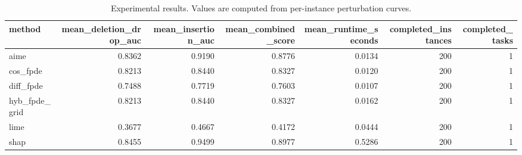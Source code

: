 \begin{table}[t]
\caption{Experimental results. Values are computed from per-instance perturbation curves.}
\label{tab:main_results_computed}
\centering
\begin{tabular}{lrrrrrr}
\toprule
method & mean\_deletion\_drop\_auc & mean\_insertion\_auc & mean\_combined\_score & mean\_runtime\_seconds & completed\_instances & completed\_tasks \\
\midrule
aime & 0.8362 & 0.9190 & 0.8776 & 0.0134 & 200 & 1 \\
cos\_fpde & 0.8213 & 0.8440 & 0.8327 & 0.0120 & 200 & 1 \\
diff\_fpde & 0.7488 & 0.7719 & 0.7603 & 0.0107 & 200 & 1 \\
hyb\_fpde\_grid & 0.8213 & 0.8440 & 0.8327 & 0.0162 & 200 & 1 \\
lime & 0.3677 & 0.4667 & 0.4172 & 0.0444 & 200 & 1 \\
shap & 0.8455 & 0.9499 & 0.8977 & 0.5286 & 200 & 1 \\
\bottomrule
\end{tabular}

\end{table}
